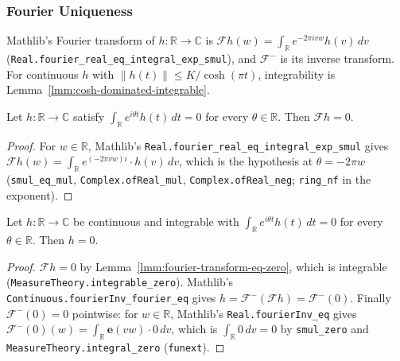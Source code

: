 \subsubsection{Fourier Uniqueness}

Mathlib's Fourier transform of $h : \mathbb{R} \to \mathbb{C}$ is $\mathcal{F}h(w) = \int_{\mathbb{R}} e^{-2\pi i v w} h(v) \, dv$ (\texttt{Real.fourier\_real\_eq\_integral\_exp\_smul}), and $\mathcal{F}^{-}$ is its inverse transform. For continuous $h$ with $\|h(t)\| \le K/\cosh(\pi t)$, integrability is Lemma~\ref{lmm:cosh-dominated-integrable}.

\begin{lemma}
    \label{lmm:fourier-transform-eq-zero}
    \leanok
    Let $h : \mathbb{R} \to \mathbb{C}$ satisfy $\int_{\mathbb{R}} e^{i\theta t} h(t) \, dt = 0$ for every $\theta \in \mathbb{R}$. Then $\mathcal{F}h = 0$.
\end{lemma}
\begin{proof}
    \leanok
    For $w \in \mathbb{R}$, Mathlib's \texttt{Real.fourier\_real\_eq\_integral\_exp\_smul} gives $\mathcal{F}h(w) = \int_{\mathbb{R}} e^{(-2\pi v w) i} \cdot h(v) \, dv$, which is the hypothesis at $\theta = -2\pi w$ (\texttt{smul\_eq\_mul}, \texttt{Complex.ofReal\_mul}, \texttt{Complex.ofReal\_neg}; \texttt{ring\_nf} in the exponent).
\end{proof}

\begin{theorem}
    \label{thrm:fourier-uniqueness}
    \leanok
    Let $h : \mathbb{R} \to \mathbb{C}$ be continuous and integrable with $\int_{\mathbb{R}} e^{i\theta t} h(t) \, dt = 0$ for every $\theta \in \mathbb{R}$. Then $h = 0$.
\end{theorem}
\begin{proof}
    \leanok
    $\mathcal{F}h = 0$ by Lemma~\ref{lmm:fourier-transform-eq-zero}, which is integrable (\texttt{MeasureTheory.integrable\_zero}). Mathlib's \texttt{Continuous.fourierInv\_fourier\_eq} gives $h = \mathcal{F}^{-}(\mathcal{F}h) = \mathcal{F}^{-}(0)$. Finally $\mathcal{F}^{-}(0) = 0$ pointwise: for $w \in \mathbb{R}$, Mathlib's \texttt{Real.fourierInv\_eq} gives $\mathcal{F}^{-}(0)(w) = \int_{\mathbb{R}} \mathbf{e}(v w) \cdot 0 \, dv$, which is $\int_{\mathbb{R}} 0 \, dv = 0$ by \texttt{smul\_zero} and \texttt{MeasureTheory.integral\_zero} (\texttt{funext}).
\end{proof}

